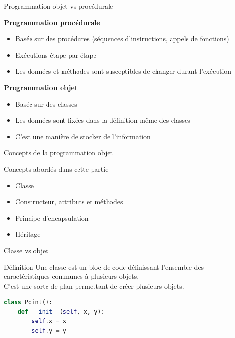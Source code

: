 \documentclass[10pt]{beamer}
\begin{document}
\begin{frame}{Programmation objet vs procédurale}

  \begin{minipage}[t]{0.48\textwidth}
  \textbf{Programmation procédurale}
  \begin{itemize}
    \item<1-> Basée sur des procédures (séquences d'instructions, appels de fonctions)
    \item<2-> Exécutions étape par étape
    \item<3-> Les données et méthodes sont susceptibles de changer durant l'exécution
  \end{itemize}
  \end{minipage}
  \hfill
  \begin{minipage}[t]{0.48\textwidth}
  \textbf{Programmation objet}
  \begin{itemize}
    \item<1-> Basée sur des classes
    \item<3-> Les données sont fixées dans la définition même des classes
    \item<4> C'est une manière de stocker de l'information
  \end{itemize}
  \end{minipage}
\end{frame}


\begin{frame}{Concepts de la programmation objet}
  \begin{block}{Concepts abordés dans cette partie}
    \medskip
    \begin{itemize}
      \item<+-> Classe 
      \item<+-> Constructeur, attributs et méthodes 
      \item<+-> Principe d'encapsulation
      \item<+-> Héritage
    \end{itemize}
  \end{block}
\end{frame}






\begin{frame}[fragile]{Classe vs objet}
  \begin{block}{Définition}
    \medskip
    Une classe est un bloc de code définissant l'ensemble des caractéristiques communes à plusieurs objets.\\
    C'est une sorte de plan permettant de créer plusieurs objets.
  \end{block}
\bigskip
\begin{lstlisting}[language=Python, numbers=none]
class Point():
    def __init__(self, x, y):
        self.x = x
        self.y = y
\end{lstlisting}

\end{frame}
\end{document}
